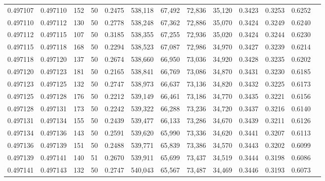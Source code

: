 \begin{tabular}{rrrrrrrrrrrrr}
0.497107 & 0.497110 &   152 &  50 &                                     0.2475 & 538,118 &  67,492 &  72,836 &  35,120 & 0.3423 & 0.3253 & 0.6252 \\
0.497110 & 0.497112 &   130 &  50 &                                     0.2778 & 538,248 &  67,362 &  72,886 &  35,070 & 0.3424 & 0.3249 & 0.6240 \\
0.497112 & 0.497115 &   107 &  50 &                                     0.3185 & 538,355 &  67,255 &  72,936 &  35,020 & 0.3424 & 0.3244 & 0.6230 \\
0.497115 & 0.497118 &   168 &  50 &                                     0.2294 & 538,523 &  67,087 &  72,986 &  34,970 & 0.3427 & 0.3239 & 0.6214 \\
0.497118 & 0.497120 &   137 &  50 &                                     0.2674 & 538,660 &  66,950 &  73,036 &  34,920 & 0.3428 & 0.3235 & 0.6202 \\
0.497120 & 0.497123 &   181 &  50 &                                     0.2165 & 538,841 &  66,769 &  73,086 &  34,870 & 0.3431 & 0.3230 & 0.6185 \\
0.497123 & 0.497125 &   132 &  50 &                                     0.2747 & 538,973 &  66,637 &  73,136 &  34,820 & 0.3432 & 0.3225 & 0.6173 \\
0.497125 & 0.497128 &   176 &  50 &                                     0.2212 & 539,149 &  66,461 &  73,186 &  34,770 & 0.3435 & 0.3221 & 0.6156 \\
0.497128 & 0.497131 &   173 &  50 &                                     0.2242 & 539,322 &  66,288 &  73,236 &  34,720 & 0.3437 & 0.3216 & 0.6140 \\
0.497131 & 0.497134 &   155 &  50 &                                     0.2439 & 539,477 &  66,133 &  73,286 &  34,670 & 0.3439 & 0.3211 & 0.6126 \\
0.497134 & 0.497136 &   143 &  50 &                                     0.2591 & 539,620 &  65,990 &  73,336 &  34,620 & 0.3441 & 0.3207 & 0.6113 \\
0.497136 & 0.497139 &   151 &  50 &                                     0.2488 & 539,771 &  65,839 &  73,386 &  34,570 & 0.3443 & 0.3202 & 0.6099 \\
0.497139 & 0.497141 &   140 &  51 &                                     0.2670 & 539,911 &  65,699 &  73,437 &  34,519 & 0.3444 & 0.3198 & 0.6086 \\
0.497141 & 0.497143 &   132 &  50 &                                     0.2747 & 540,043 &  65,567 &  73,487 &  34,469 & 0.3446 & 0.3193 & 0.6073 \\

\end{tabular}
